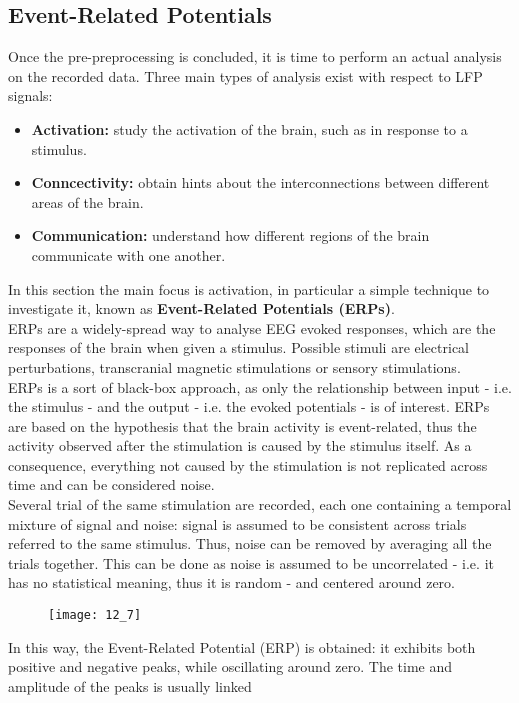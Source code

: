 \subsection{Event-Related Potentials}
Once the pre-preprocessing is concluded, it is time to perform an actual analysis on the
recorded data. Three main types of analysis exist with respect to LFP signals:
\begin{itemize}
    \item \textbf{Activation:} study the activation of the brain, such as in response to a stimulus.
    \item \textbf{Conncectivity:} obtain hints about the interconnections between different
          areas of the brain.
    \item \textbf{Communication:} understand how different regions of the brain communicate
          with one another.
\end{itemize}
In this section the main focus is activation, in particular a simple technique to investigate
it, known as \textbf{Event-Related Potentials (ERPs)}.\\
ERPs are a widely-spread way to analyse EEG evoked responses, which are the responses of the brain
when given a stimulus. Possible stimuli are electrical perturbations, transcranial magnetic stimulations
or sensory stimulations.\\
ERPs is a sort of black-box approach, as only the relationship between
input - i.e. the stimulus - and the output - i.e. the evoked potentials - is of interest.
ERPs are based on the hypothesis that the brain activity is event-related, thus the activity
observed after the stimulation is caused by the stimulus itself. As a consequence, everything
not caused by the stimulation is not replicated across time and can be considered noise.\\
Several trial of the same stimulation are recorded, each one containing a temporal mixture
of signal and noise: signal is assumed to be consistent across trials referred to the same
stimulus. Thus, noise can be removed by averaging all the trials together. This can be done
as noise is assumed to be uncorrelated - i.e. it has no statistical meaning, thus it is random -
and centered around zero.
\begin{figure}[H]
    \centering
    \texttt{[image: 12\_7]}
\end{figure}
In this way, the Event-Related Potential (ERP) is obtained: it exhibits both positive and negative
peaks, while oscillating around zero. The time and amplitude of the peaks is usually linked
